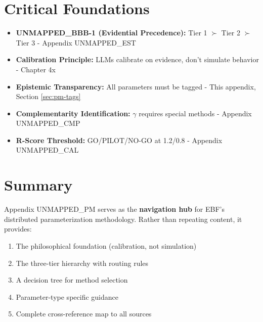 
\section{Critical Foundations}
\label{sec:pm-foundations}

\begin{itemize}
    \item \textbf{UNMAPPED_BBB-1 (Evidential Precedence):} Tier 1 $\succ$ Tier 2 $\succ$ Tier 3 - Appendix UNMAPPED_EST
    \item \textbf{Calibration Principle:} LLMs calibrate on evidence, don't simulate behavior - Chapter 4x
    \item \textbf{Epistemic Transparency:} All parameters must be tagged - This appendix, Section \ref{sec:pm-tags}
    \item \textbf{Complementarity Identification:} $\gamma$ requires special methods - Appendix UNMAPPED_CMP
    \item \textbf{R-Score Threshold:} GO/PILOT/NO-GO at 1.2/0.8 - Appendix UNMAPPED_CAL
\end{itemize}


\section{Summary}
\label{sec:pm-summary}

Appendix UNMAPPED_PM serves as the \textbf{navigation hub} for EBF's distributed parameterization methodology. Rather than repeating content, it provides:

\begin{enumerate}[nosep]
    \item The philosophical foundation (calibration, not simulation)
    \item The three-tier hierarchy with routing rules
    \item A decision tree for method selection
    \item Parameter-type specific guidance
    \item Complete cross-reference map to all sources
\end{enumerate}

